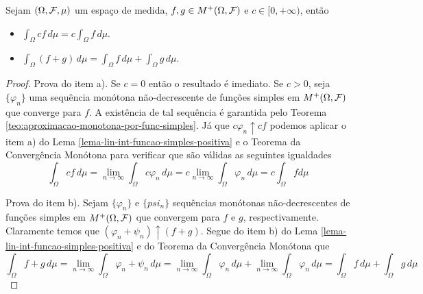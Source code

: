 \begin{corolario}
\label{cor-lin-int-funcao-simples-positiva}
Sejam $(\Omega,\mathcal{F},\mu)$ um espaço de medida, 
$f,g \in M^+(\Omega,\mathcal{F})$ e $c\in [0,+\infty)$,
então
\begin{itemize}
	\item[a)]
	\(\displaystyle 
		\int_{\Omega} c f\, d\mu
		=
		c\int_{\Omega} f \, d\mu.
	\)
	

	\item[b)]
	\(\displaystyle 
		\int_{\Omega} (f+g)\, d\mu
		=
		\int_{\Omega} f \, d\mu
		+
		\int_{\Omega} g \, d\mu.
	\)

\end{itemize}
\end{corolario}


\begin{proof}
Prova do item a). 
Se $c=0$ então o resultado é imediato.
Se $c>0$, seja $\{\varphi_n\}$ uma sequência 
monótona não-decrescente de funções simples em 
$M^{+}(\Omega,\mathcal{F})$ que converge para $f$.
A existência de tal sequência é garantida 
pelo Teorema \ref{teo:aproximacao-monotona-por-func-simples}.
Já que $c\varphi_n \uparrow cf$ podemos aplicar o item a) do
Lema \ref{lema-lin-int-funcao-simples-positiva} e
o Teorema da Convergência Monótona para verificar que 
são válidas as seguintes igualdades
	\[
	\int_{\Omega} cf\, d\mu
	=
	\lim_{n\to\infty} \int_{\Omega} c\varphi_n\, d\mu
	=
	c\lim_{n\to\infty} \int_{\Omega} \varphi_n\, d\mu	
	=
	c\int_{\Omega} f d\mu		
	\] 



Prova do item b). Sejam 
$\{\varphi_n\}$ e $\{psi_n\}$ sequências
monótonas não-decrescentes de funções simples em 
$M^{+}(\Omega,\mathcal{F})$ que convergem para $f$ e $g$,
respectivamente. Claramente temos que 
$(\varphi_n+\psi_n) \uparrow (f+g)$.
Segue do item b) do 
Lema \ref{lema-lin-int-funcao-simples-positiva}
e do Teorema da Convergência Monótona que 
	\[
	\int_{\Omega} f+g\, d\mu
	=
	\lim_{n\to\infty} \int_{\Omega} \varphi_n+\psi_n\, d\mu
	=
	\lim_{n\to\infty} \int_{\Omega} \varphi_n\, d\mu
	+		
	\lim_{n\to\infty} \int_{\Omega} \varphi_n\, d\mu	
	=
	\int_{\Omega} f\, d\mu+\int_{\Omega} g\, d\mu
	\] 




\end{proof}